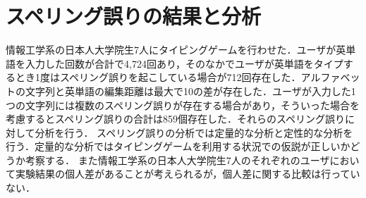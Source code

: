 \chapter{スペリング誤りの結果と分析}
情報工学系の日本人大学院生7人にタイピングゲームを行わせた．ユーザが英単語を入力した回数が合計で4,724回あり，そのなかでユーザが英単語をタイプするとき1度はスペリング誤りを起こしている場合が712回存在した．アルファベットの文字列と英単語の編集距離は最大で10の差が存在した．ユーザが入力した1つの文字列には複数のスペリング誤りが存在する場合があり，そういった場合を考慮するとスペリング誤りの合計は859個存在した．それらのスペリング誤りに対して分析を行う．
スペリング誤りの分析では定量的な分析と定性的な分析を行う．定量的な分析ではタイピングゲームを利用する状況での仮説が正しいかどうか考察する．
また情報工学系の日本人大学院生7人のそれぞれのユーザにおいて実験結果の個人差があることが考えられるが，個人差に関する比較は行っていない．

